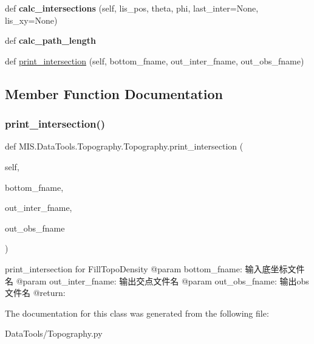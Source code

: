 \begin{DoxyCompactItemize}
\mbox{\label{classMIS_1_1DataTools_1_1Topography_1_1Topography_aa32b53fed252723a72aa061f7938d015}} 
def {\bfseries calc\+\_\+intersections} (self, lis\+\_\+pos, theta, phi, last\+\_\+inter=None, lis\+\_\+xy=None)
\item 
\mbox{\label{classMIS_1_1DataTools_1_1Topography_1_1Topography_a63b01a75cb3e1330b8b04fb417b97b9c}} 
def {\bfseries calc\+\_\+path\+\_\+length}
\item 
def \hyperlink{classMIS_1_1DataTools_1_1Topography_1_1Topography_a8c2efab61e42fadc2a376451a36478bc}{print\+\_\+intersection} (self, bottom\+\_\+fname, out\+\_\+inter\+\_\+fname, out\+\_\+obs\+\_\+fname)
\end{DoxyCompactItemize}


\subsection{Member Function Documentation}
\mbox{\label{classMIS_1_1DataTools_1_1Topography_1_1Topography_a8c2efab61e42fadc2a376451a36478bc}} 
\subsubsection{\texorpdfstring{print\+\_\+intersection()}{print\_intersection()}}
{\footnotesize\ttfamily def M\+I\+S.\+Data\+Tools.\+Topography.\+Topography.\+print\+\_\+intersection (\begin{DoxyParamCaption}\item[{}]{self,  }\item[{}]{bottom\+\_\+fname,  }\item[{}]{out\+\_\+inter\+\_\+fname,  }\item[{}]{out\+\_\+obs\+\_\+fname }\end{DoxyParamCaption})}

\begin{DoxyVerb}print_intersection for FillTopoDensity
@param bottom_fname: 输入底坐标文件名
@param out_inter_fname: 输出交点文件名
@param out_obs_fname: 输出obs文件名
@return:
\end{DoxyVerb}
 

The documentation for this class was generated from the following file\+:\begin{DoxyCompactItemize}
\item 
Data\+Tools/Topography.\+py\end{DoxyCompactItemize}
